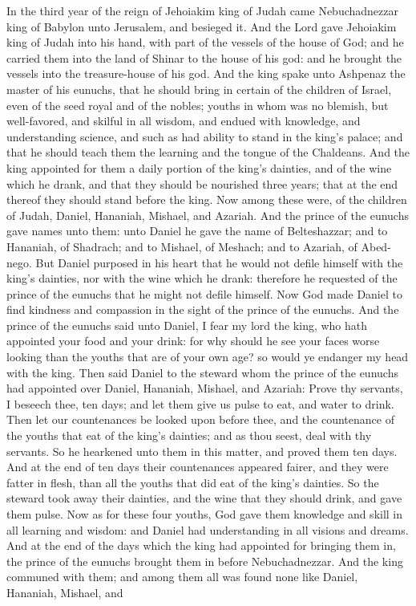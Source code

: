 


In the third year of the reign of Jehoiakim king of Judah came Nebuchadnezzar king of Babylon unto Jerusalem, and besieged it. And the Lord gave Jehoiakim king of Judah into his hand, with part of the vessels of the house of God; and he carried them into the land of Shinar to the house of his god: and he brought the vessels into the treasure-house of his god. And the king spake unto Ashpenaz the master of his eunuchs, that he should bring in certain of the children of Israel, even of the seed royal and of the nobles; youths in whom was no blemish, but well-favored, and skilful in all wisdom, and endued with knowledge, and understanding science, and such as had ability to stand in the king’s palace; and that he should teach them the learning and the tongue of the Chaldeans. And the king appointed for them a daily portion of the king’s dainties, and of the wine which he drank, and that they should be nourished three years; that at the end thereof they should stand before the king. Now among these were, of the children of Judah, Daniel, Hananiah, Mishael, and Azariah. And the prince of the eunuchs gave names unto them: unto Daniel he gave the name of Belteshazzar; and to Hananiah, of Shadrach; and to Mishael, of Meshach; and to Azariah, of Abed-nego.  But Daniel purposed in his heart that he would not defile himself with the king’s dainties, nor with the wine which he drank: therefore he requested of the prince of the eunuchs that he might not defile himself. Now God made Daniel to find kindness and compassion in the sight of the prince of the eunuchs. And the prince of the eunuchs said unto Daniel, I fear my lord the king, who hath appointed your food and your drink: for why should he see your faces worse looking than the youths that are of your own age? so would ye endanger my head with the king. Then said Daniel to the steward whom the prince of the eunuchs had appointed over Daniel, Hananiah, Mishael, and Azariah: Prove thy servants, I beseech thee, ten days; and let them give us pulse to eat, and water to drink. Then let our countenances be looked upon before thee, and the countenance of the youths that eat of the king’s dainties; and as thou seest, deal with thy servants.  So he hearkened unto them in this matter, and proved them ten days. And at the end of ten days their countenances appeared fairer, and they were fatter in flesh, than all the youths that did eat of the king’s dainties. So the steward took away their dainties, and the wine that they should drink, and gave them pulse.  Now as for these four youths, God gave them knowledge and skill in all learning and wisdom: and Daniel had understanding in all visions and dreams. And at the end of the days which the king had appointed for bringing them in, the prince of the eunuchs brought them in before Nebuchadnezzar. And the king communed with them; and among them all was found none like Daniel, Hananiah, Mishael, and 
